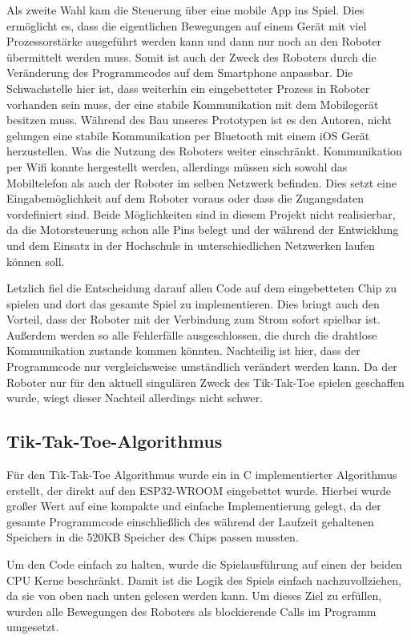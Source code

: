 \documentclass[conference,compsoc,final,a4paper]{IEEEtran}
\begin{document}
Als zweite Wahl kam die Steuerung über eine mobile App ins Spiel. Dies ermöglicht es, dass die
eigentlichen Bewegungen auf einem Gerät mit viel Prozessorstärke ausgeführt werden kann und dann nur
noch an den Roboter übermittelt werden muss. Somit ist auch der Zweck des Roboters
durch die Veränderung des Programmcodes auf dem Smartphone anpassbar. Die Schwachstelle hier ist,
dass weiterhin ein eingebetteter Prozess in Roboter vorhanden sein muss, der eine stabile
Kommunikation mit dem Mobilegerät besitzen muss. Während des Bau unseres Prototypen ist es den Autoren,
nicht gelungen eine stabile Kommunikation per Bluetooth mit einem iOS Gerät herzustellen.
Was die Nutzung des Roboters weiter einschränkt. Kommunikation per Wifi konnte hergestellt werden,
allerdings müssen sich sowohl das Mobiltelefon als auch der Roboter im 
selben Netzwerk befinden. Dies setzt eine Eingabemöglichkeit auf dem Roboter voraus oder dass
die Zugangsdaten vordefiniert sind. Beide Möglichkeiten sind in diesem Projekt nicht realisierbar,
da die Motorsteuerung schon alle Pins belegt und der während der Entwicklung und dem Einsatz in der
Hochschule in unterschiedlichen Netzwerken laufen können soll.

Letzlich fiel die Entscheidung darauf allen Code auf dem eingebetteten Chip zu spielen und dort
das gesamte Spiel zu implementieren. Dies bringt auch den Vorteil, dass der Roboter mit der Verbindung
zum Strom sofort spielbar ist. Außerdem werden so alle Fehlerfälle ausgeschlossen, die durch die
drahtlose Kommunikation zustande kommen könnten. Nachteilig ist hier, dass der Programmcode nur
vergleichsweise umständlich verändert werden kann. Da der Roboter nur für den aktuell singulären
Zweck des Tik-Tak-Toe spielen geschaffen wurde, wiegt dieser Nachteil allerdings nicht schwer.

\subsection{Tik-Tak-Toe-Algorithmus}

Für den Tik-Tak-Toe Algorithmus wurde ein in C implementierter Algorithmus erstellt, der direkt auf
den ESP32-WROOM eingebettet wurde. Hierbei wurde großer Wert auf eine kompakte und einfache
Implementierung gelegt, da der gesamte Programmcode einschließlich des während der Laufzeit
gehaltenen Speichers in die 520KB Speicher des Chips passen mussten.

Um den Code einfach zu halten, wurde die Spielausführung auf einen der beiden CPU Kerne beschränkt.
Damit ist die Logik des Spiels einfach nachzuvollziehen, da sie von oben nach unten gelesen werden kann.
Um dieses Ziel zu erfüllen, wurden alle Bewegungen des Roboters als blockierende Calls im Programm
umgesetzt.
\end{document}

